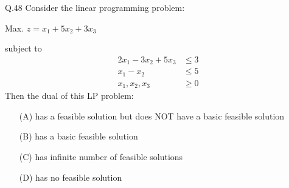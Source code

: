 \documentclass{article}
\begin{document}
																																																																																						   Q.48 \quad Consider the linear programming problem:
																																																																																						      \begin{flushleft}
																																																																																						      \hspace{3cm} Max. $z = x_1 + 5x_2 + 3x_3$
																																																																																						         \end{flushleft} 
																																																																																							     \hspace{3cm} subject to
																																																																																							         \begin{align*}
																																																																																								         2x_1 - 3x_2 + 5x_3 &\leq 3 \\
																																																																																									         x_1 - x_2 &\leq 5 \\
																																																																																										         x_1, x_2, x_3 &\geq 0
																																																																																											     \end{align*}
																																																																																											         Then the dual of this LP problem:
																																																																																												     \begin{itemize}
																																																																																												         
																																																																																													         \item[(A)] has a feasible solution but does NOT have a basic feasible solution
																																																																																														         \item[(B)] has a basic feasible solution
																																																																																															         \item[(C)] has infinite number of feasible solutions
																																																																																																         \item[(D)] has no feasible solution
																																																																																																	  \end{itemize}
\end{document}
